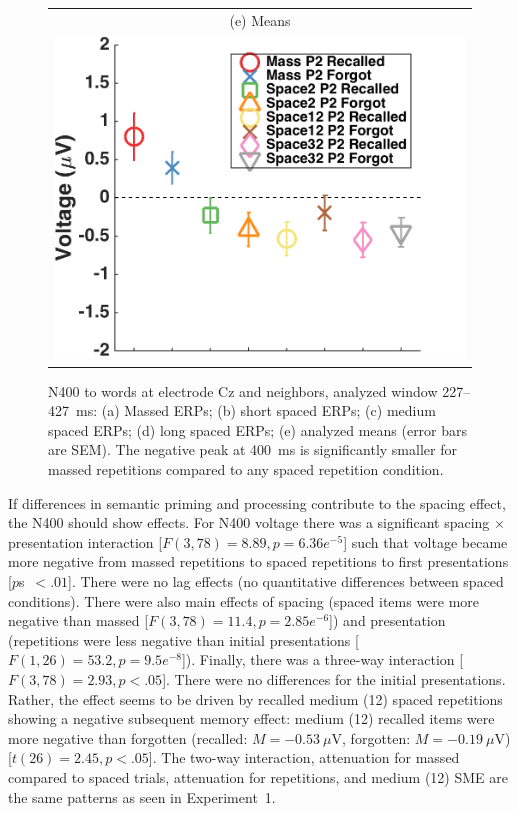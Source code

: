 \begin{figure}[hp]
\begin{tabular}{cc}
  \multicolumn{2}{c}{(e) Means} \\
  \multicolumn{2}{c}{\includegraphics[width=.35\textwidth]{./figs/exp2/tla_avg_ga_word_rc_mass_p2_word_fo_mass_p2_word_rc_spac2_p2_word_fo_spac2_p2_word_rc_spac12_p2_word_fo_spac12_p2_word_rc_spac32_p2_word_fo_spac32_p2_C_277_427_ylabel}} \\
  \end{tabular}
  \caption{N400 to words at electrode Cz and neighbors, analyzed window 227--427~ms: (a) Massed ERPs; (b) short spaced ERPs; (c) medium spaced ERPs; (d) long spaced ERPs; (e) analyzed means (error bars are SEM).  The negative peak at 400~ms is significantly smaller for massed repetitions compared to any spaced repetition condition.}
  \label{fig:s2_N400}
\end{figure}


If differences in semantic priming and processing contribute to the spacing effect, the N400 should show effects.
For N400 voltage there was a significant spacing $\times$ presentation interaction [$F(3,78)=8.89, p=6.36e^{-5}$] such that voltage became more negative from massed repetitions to spaced repetitions to first presentations [$p$s~$<.01$].  There were no lag effects (no quantitative differences between spaced conditions).  There were also main effects of spacing (spaced items were more negative than massed [$F(3,78)=11.4, p=2.85e^{-6}$]) and presentation (repetitions were less negative than initial presentations [$F(1,26)=53.2, p=9.5e^{-8}$]).  Finally, there was a three-way interaction [$F(3,78)=2.93, p<.05$].  There were no differences for the initial presentations.  Rather, the effect seems to be driven by recalled medium (12) spaced repetitions showing a negative subsequent memory effect: medium (12) recalled items were more negative than forgotten (recalled: $M=-0.53~\mu$V, forgotten: $M=-0.19~\mu$V) [$t(26)=2.45, p<.05$].  
The two-way interaction, attenuation for massed compared to spaced trials, attenuation for repetitions, and medium (12) SME are the same patterns as seen in Experiment~1.


